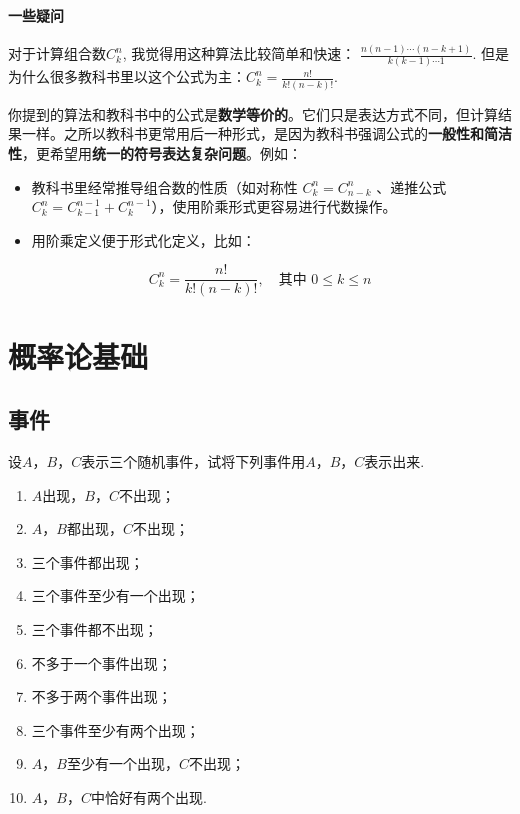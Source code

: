 \documentclass[a4paper]{ctexbook}
\begin{document}
\subsubsection*{一些疑问}
对于计算组合数$C_k^n$, 我觉得用这种算法比较简单和快速： $\frac{n(n-1) \cdots (n-k+1)}{k(k-1) \cdots 1}$.
但是为什么很多教科书里以这个公式为主：$C_k^n=\frac{n!}{k!(n-k)!}$.

你提到的算法和教科书中的公式是\textbf{数学等价的}。它们只是表达方式不同，但计算结果一样。之所以教科书更常用后一种形式，是因为教科书强调公式的\textbf{一般性和简洁性}，更希望用\textbf{统一的符号表达复杂问题}。例如：

\begin{itemize}
\item 教科书里经常推导组合数的性质（如对称性 $C_k^n = C_{n-k}^n$\: 、递推公式 $C_k^n = C_{k-1}^{n-1} + C_k^{n-1}$），使用阶乘形式更容易进行代数操作。
\item 用阶乘定义便于形式化定义，比如：
\end{itemize}

  $$
  C_k^n = \frac{n!}{k!(n-k)!}, \quad \text{其中 } 0 \le k \le n
  $$

\chapter{概率论基础}

\section{事件}

设$A$，$B$，$C$表示三个随机事件，试将下列事件用$A$，$B$，$C$表示出来.

\begin{multicols}{2}
\begin{enumerate}[label=(\arabic*)]
\item $A$出现，$B$，$C$不出现；
\item $A$，$B$都出现，$C$不出现；
\item 三个事件都出现；
\item 三个事件至少有一个出现；
\item 三个事件都不出现；
\item 不多于一个事件出现；
\item 不多于两个事件出现；
\item 三个事件至少有两个出现；
\item $A$，$B$至少有一个出现，$C$不出现；
\item$A$，$B$，$C$中恰好有两个出现.
\end{enumerate}
\end{multicols}
\end{document}
